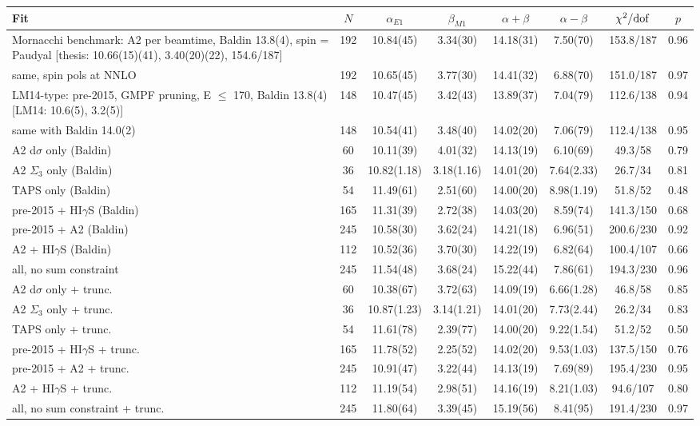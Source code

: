 \begin{tabular}{lccccccc}
\hline
Fit & $N$ & $\alpha_{E1}$ & $\beta_{M1}$ & $\alpha+\beta$ & $\alpha-\beta$ & $\chi^2/{\rm dof}$ & $p$ \\
\hline
Mornacchi benchmark: A2 per beamtime, Baldin 13.8(4), spin = Paudyal [thesis: 10.66(15)(41), 3.40(20)(22), 154.6/187] & 192 & 10.84(45) & 3.34(30) & 14.18(31) & 7.50(70) & 153.8/187 & 0.96 \\
same, spin pols at NNLO & 192 & 10.65(45) & 3.77(30) & 14.41(32) & 6.88(70) & 151.0/187 & 0.97 \\
LM14-type: pre-2015, GMPF pruning, E $\le$ 170, Baldin 13.8(4) [LM14: 10.6(5), 3.2(5)] & 148 & 10.47(45) & 3.42(43) & 13.89(37) & 7.04(79) & 112.6/138 & 0.94 \\
same with Baldin 14.0(2) & 148 & 10.54(41) & 3.48(40) & 14.02(20) & 7.06(79) & 112.4/138 & 0.95 \\
A2 d$\sigma$ only (Baldin) & 60 & 10.11(39) & 4.01(32) & 14.13(19) & 6.10(69) & 49.3/58 & 0.79 \\
A2 $\Sigma_3$ only (Baldin) & 36 & 10.82(1.18) & 3.18(1.16) & 14.01(20) & 7.64(2.33) & 26.7/34 & 0.81 \\
TAPS only (Baldin) & 54 & 11.49(61) & 2.51(60) & 14.00(20) & 8.98(1.19) & 51.8/52 & 0.48 \\
pre-2015 + HI$\gamma$S (Baldin) & 165 & 11.31(39) & 2.72(38) & 14.03(20) & 8.59(74) & 141.3/150 & 0.68 \\
pre-2015 + A2 (Baldin) & 245 & 10.58(30) & 3.62(24) & 14.21(18) & 6.96(51) & 200.6/230 & 0.92 \\
A2 + HI$\gamma$S (Baldin) & 112 & 10.52(36) & 3.70(30) & 14.22(19) & 6.82(64) & 100.4/107 & 0.66 \\
all, no sum constraint & 245 & 11.54(48) & 3.68(24) & 15.22(44) & 7.86(61) & 194.3/230 & 0.96 \\
A2 d$\sigma$ only + trunc. & 60 & 10.38(67) & 3.72(63) & 14.09(19) & 6.66(1.28) & 46.8/58 & 0.85 \\
A2 $\Sigma_3$ only + trunc. & 36 & 10.87(1.23) & 3.14(1.21) & 14.01(20) & 7.73(2.44) & 26.2/34 & 0.83 \\
TAPS only + trunc. & 54 & 11.61(78) & 2.39(77) & 14.00(20) & 9.22(1.54) & 51.2/52 & 0.50 \\
pre-2015 + HI$\gamma$S + trunc. & 165 & 11.78(52) & 2.25(52) & 14.02(20) & 9.53(1.03) & 137.5/150 & 0.76 \\
pre-2015 + A2 + trunc. & 245 & 10.91(47) & 3.22(44) & 14.13(19) & 7.69(89) & 195.4/230 & 0.95 \\
A2 + HI$\gamma$S + trunc. & 112 & 11.19(54) & 2.98(51) & 14.16(19) & 8.21(1.03) & 94.6/107 & 0.80 \\
all, no sum constraint + trunc. & 245 & 11.80(64) & 3.39(45) & 15.19(56) & 8.41(95) & 191.4/230 & 0.97 \\
\hline
\end{tabular}
